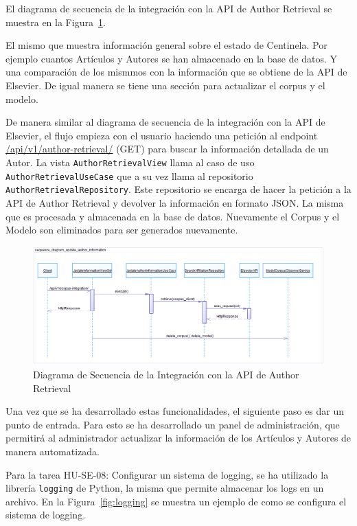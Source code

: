 El diagrama de secuencia de la integración con la API de Author Retrieval se muestra en la Figura~\ref{fig:sequence-diagram-author-retrieval}.


El mismo que muestra información general sobre el estado de Centinela. Por ejemplo cuantos Artículos y Autores se han almacenado en la base de datos.
Y una comparación de los mismmos con la información que se obtiene de la API de Elsevier.
De igual manera se tiene una sección para actualizar el corpus y el modelo.


De manera similar al diagrama de secuencia de la integración con la API de Elsevier, el flujo empieza con el usuario haciendo una petición al endpoint \url{/api/v1/author-retrieval/} (GET)
para buscar la información detallada de un Autor.
La vista \texttt{AuthorRetrievalView} llama al caso de uso \texttt{AuthorRetrievalUseCase} que a su vez llama al repositorio \texttt{AuthorRetrievalRepository}.
Este repositorio se encarga de hacer la petición a la API de Author Retrieval y devolver la información en formato JSON\@.
La misma que es procesada y almacenada en la base de datos. Nuevamente el Corpus y el Modelo son eliminados para ser generados nuevamente.

\begin{figure}[H]
    \centering
    \includegraphics[scale=0.6]{../02Figures/02Chapter/Sprints/Sprint-5/sequence_diagram_update_author_information.png}
    \caption{Diagrama de Secuencia de la Integración con la API de Author Retrieval}\label{fig:sequence-diagram-author-retrieval}
\end{figure}



Una vez que se ha desarrollado estas funcionalidades, el siguiente paso es dar un punto de entrada.
Para esto se ha desarrollado un panel de administración, que permitirá al administrador actualizar la información de los Artículos y Autores de manera automatizada.


Para la tarea HU-SE-08: Configurar un sistema de logging, se ha utilizado la librería \texttt{logging} de Python, la misma que permite almacenar los logs en un archivo.
En la Figura~\ref{fig:logging} se muestra un ejemplo de como se configura el sistema de logging.

